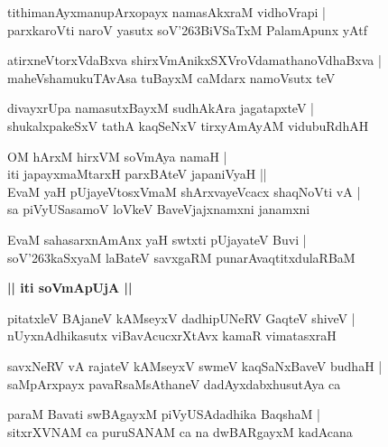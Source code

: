 \documentclass[twoside,12pt,openright]{book}
\def\S{\char'263}
\newcounter{shloka}[chapter]
\def\uvaca#1{\centerline{{\large\textbf{#1}}}}
\begin{document}
\begin{shloka}%
tithimanAyxmanupArxopayx namasAkxraM vidhoVrapi |\\
parxkaroVti naroV yasutx soV\S BiVSaTxM PalamApunx yAtf
\end{shloka}

\begin{shloka}%
atirxneVtorxVdaBxva shirxVmAnikxSXVroVdamathanoVdhaBxva |\\
maheVshamukuTAvAsa tuBayxM caMdarx namoVsutx teV 
\end{shloka}

\begin{shloka}%
divayxrUpa namasutxBayxM sudhAkAra jagatapxteV |\\
shukalxpakeSxV tathA kaqSeNxV tirxyAmAyAM vidubuRdhAH 
\end{shloka}

\begin{shloka}%
OM hArxM hirxVM soVmAya namaH |\\
iti japayxmaMtarxH parxBAteV japaniVyaH ||\\
EvaM yaH pUjayeVtosxVmaM shArxvayeVcacx shaqNoVti vA |\\
sa piVyUSasamoV loVkeV BaveVjajxnamxni janamxni
\end{shloka}

\begin{shloka}%
EvaM sahasarxnAmAnx yaH swtxti pUjayateV Buvi |\\
soV\S kaSxyaM laBateV savxgaRM punarAvaqtitxdulaRBaM 
\end{shloka}

\uvaca{|| iti soVmApUjA ||}

\begin{shloka}%
pitatxleV BAjaneV kAMseyxV dadhipUNeRV GaqteV shiveV |\\
nUyxnAdhikasutx viBavAcucxrXtAvx kamaR vimatasxraH 
\end{shloka}

\begin{shloka}%
savxNeRV vA rajateV kAMseyxV swmeV kaqSaNxBaveV budhaH |\\
saMpArxpayx pavaRsaMsAthaneV dadAyxdabxhusutAya ca 
\end{shloka}

\begin{shloka}%
paraM Bavati swBAgayxM piVyUSAdadhika  BaqshaM |\\
sitxrXVNAM ca puruSANAM ca na dwBARgayxM kadAcana 
\end{shloka}
\end{document}
